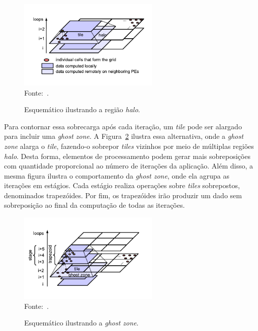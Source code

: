 \begin{figure}[!h]
	\centering
    \caption{Esquemático ilustrando a região \textit{halo}.}
    \includegraphics[width=0.6\textwidth]{figs/tilingHalo.pdf} \\
    Fonte:~\cite{meng11}.
    \label{fig:tilingHalo}
\end{figure}



Para contornar essa sobrecarga após cada iteração, um \textit{tile} pode ser
alargado para incluir uma \textit{ghost zone}. A Figura~\ref{fig:tiling} ilustra
essa alternativa, onde a \textit{ghost zone} alarga o \textit{tile}, fazendo-o
sobrepor \textit{tiles} vizinhos por meio de múltiplas regiões \textit{halo}.
Desta forma, elementos de processamento podem gerar mais sobreposições com quantidade proporcional ao
número de iterações da aplicação. Além disso, a mesma figura ilustra o
comportamento da \textit{ghost zone}, onde ela agrupa as iterações em estágios.
Cada estágio realiza operações sobre \textit{tiles} sobrepostos, denominados
trapezóides. Por fim, os trapezóides irão produzir um dado sem sobreposição ao
final da computação de todas as iterações.

\begin{figure}[!h]
	\centering
    \caption{Esquemático ilustrando a \textit{ghost zone}.}
    \includegraphics[width=0.6\textwidth]{figs/tiling.pdf} \\
    Fonte:~\cite{meng11}.
    \label{fig:tiling}
\end{figure}

